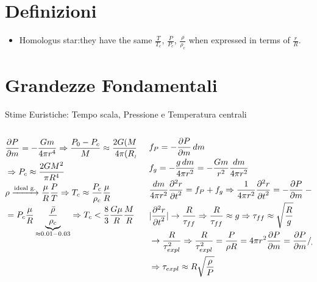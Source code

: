 \section{Definizioni}

\begin{itemize}
    \item  Homologus star:they have the same $\frac{T}{T_c}$, $\frac{P}{P_c}$, $\frac{\rho}{\rho_c}$ when expressed in terms of $\frac{r}{R}$.
\end{itemize}

\section{Grandezze Fondamentali}

\begin{frame}{Stime Euristiche: Tempo scala, Pressione e Temperatura centrali}
    \begin{columns}[T]
        \begin{column}{0.5\textwidth}
            \begin{align*}
                &\PDy{m}{P}=-\frac{Gm}{4\pi r^4}\Rightarrow \frac{P_0-P_c}{M}\approx \frac{2G(M/2)^2}{4\pi(R/2)^4}\\
                &\Rightarrow P_c\approx \frac{2GM^2}{\pi R^4}\\
                &\rho\xrightarrow{\text{ideal g.}}\frac{\mu}{R}\frac{P}{T}\Rightarrow T_c\approx \frac{P_c}{\rho_c}\frac{\mu}{R}\\
                &=P_c\frac{\mu}{R}\underbrace{\frac{\bar{\rho}}{\rho_c}}_{\approx0.01-0.03}\Rightarrow T_c<\frac{8}{3}\frac{G\mu}{R}\frac{M}{R}
            \end{align*}
        \end{column}
        \begin{column}{0.5\textwidth}
            \begin{align*}
                &f_P=-\PDy{m}{P}\,dm\\
                &f_g=-\frac{g\,dm}{4\pi r^2}=-\frac{Gm}{r^2}\frac{dm}{4\pi r^2}\\
                &\frac{dm}{4\pi r^2}\PtwoDy{t}{r}=f_P+f_g\Rightarrow \frac{1}{4\pi r^2}\PtwoDy{t}{r}=-\PDy{m}{P}-\frac{Gm}{4\pi r^4}\\
                &|\PtwoDy{t}{r}|\to \frac{R}{\tau_{ff}}\Rightarrow \frac{R}{\tau_{ff}}\approx g\Rightarrow\tau_{ff}\approx\sqrt{\frac{R}{g}}\\
                &\to \frac{R}{\tau_{expl}^2}\Rightarrow \frac{R}{\tau_{expl}^2}=\frac{P}{\rho R}=4\pi r^2\PDy{m}{P}=\PDy{m}{P}/\rho\\
                &\Rightarrow\tau_{expl}\approx R\sqrt{\frac{\rho}{P}}
            \end{align*}
        \end{column}
    \end{columns}
\end{frame}

